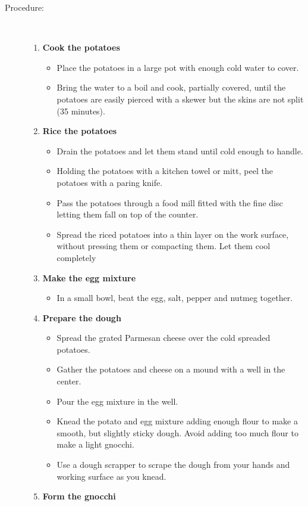\documentclass[11pt,letterpaper]{article}
\begin{document}
\begin{description}
\item[Procedure:]\ \\
	\begin{enumerate}
	\item {\bf Cook the potatoes}
	\begin{itemize}
	\item Place the potatoes in a large pot with enough cold water to cover.
        \item Bring the water to a boil and cook, partially covered, until the potatoes are easily pierced with a skewer but the skins are not split (35 minutes).
	\end{itemize}
	\item {\bf Rice the potatoes}
	\begin{itemize}
	\item Drain the potatoes and let them stand until cold enough to handle.
	\item Holding the potatoes with a kitchen towel or mitt, peel the potatoes with a paring knife.
	\item Pass the potatoes through a food mill fitted with the fine disc letting them fall on top of the counter.
	\item Spread the riced potatoes into a thin layer on the work surface, without pressing them or compacting them. Let them cool completely
	\end{itemize}
	\item {\bf Make the egg mixture}
	\begin{itemize}
	\item In a small bowl, beat the egg, salt, pepper and nutmeg together.
	\end{itemize}
	\item {\bf Prepare the dough}
	\begin{itemize}
	\item Spread the grated Parmesan cheese over the cold spreaded potatoes.
	\item Gather the potatoes and cheese on a mound with a well in the center.
	\item Pour the egg mixture in the well.
	\item Knead the potato and egg mixture adding enough flour to make a smooth, but slightly sticky dough. Avoid adding too much flour to make a light gnocchi.
	\item Use a dough scrapper to scrape the dough from your hands and working surface as you knead.
	\end{itemize}
	\item {\bf Form the gnocchi}

\end{enumerate}
\end{description}
\end{document}
